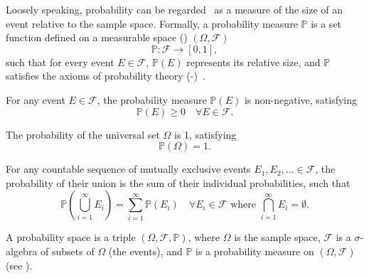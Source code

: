 \begin{definition}
	\label{def:probability}
	Loosely speaking, probability can be regarded~\cite{chan2021introduction} 
	as a measure of the size of an event relative to the sample space. 
	Formally, a probability measure $\mathbb{P}$ 
	is a set function defined on a measurable space 
	() $(\Omega, \mathcal{F})$
	\begin{equation}
		\mathbb{P}: \mathcal{F} \to [0,1],
	\end{equation}
	such that for every event $E \in \mathcal{F}$, $\mathbb{P}(E)$ represents its 
	relative size, and $\mathbb{P}$ satisfies the axioms of probability theory 
	(-)~\cite{kolmogorov1950foundations}.
\end{definition}

\begin{axiom}
	\label{ax:non_neg}
	For any event $E\in \mathcal{F}$, the probability measure $\mathbb{P}(E)$ is non-negative, satisfying
	\begin{equation}
		\mathbb{P}(E) \geq 0 \quad \forall E \in  \mathcal{F}.
	\end{equation}
\end{axiom}

\begin{axiom}[Normalization]
	\label{ax:norm}
	The probability of the universal set $\Omega$ is 1, satisfying
	\begin{equation}
		\mathbb{P}(\Omega) = 1.
	\end{equation}
\end{axiom}

\begin{axiom}[Additivity]
	\label{ax:add}
	For any countable sequence of mutually exclusive events $\mathit{E}_1, \mathit{E}_2, \ldots\in \mathcal{F}$, the probability of their union is the sum of their individual probabilities, such that
	\begin{equation}
		\mathbb{P}\left(\bigcup_{i=1}^{\infty} \mathit{E}_i\right) = \sum_{i=1}^{\infty} \mathbb{P}(\mathit{E}_i) \quad \forall \mathit{E}_i \in \mathcal{F} \text{ where } \bigcap_{i=1}^{\infty} \mathit{E}_i = \emptyset.
	\end{equation}
\end{axiom}
\begin{definition}
	\label{def:probability_space}
	A probability space is a triple 
	$(\Omega, \mathcal{F}, \mathbb{P})$, where $\Omega$ is the sample space, 
	$\mathcal{F}$ is a $\sigma$-algebra of subsets of $\Omega$ (the events), 
	and $\mathbb{P}$ is a probability measure on $(\Omega, \mathcal{F})$ (see ).
\end{definition}

